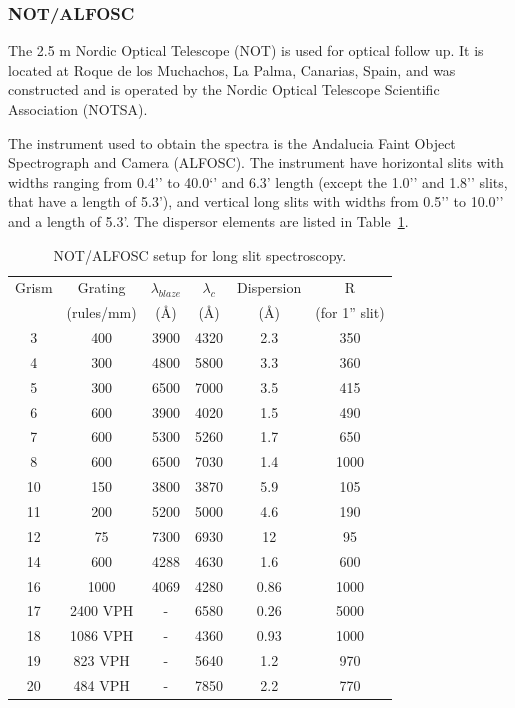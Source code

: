 \subsubsection{NOT/ALFOSC}
\label{sec2:not}

The 2.5 m Nordic Optical Telescope (NOT) is used for optical follow up. It is located at Roque de los Muchachos, La Palma, Canarias, Spain, and was constructed and is operated by the Nordic Optical Telescope Scientific Association (NOTSA). 

The instrument used to obtain the spectra is the Andalucia Faint Object Spectrograph and Camera (ALFOSC). The instrument have horizontal slits with widths ranging from 0.4’’ to 40.0‘’ and 6.3’ length (except the 1.0’’ and 1.8’’ slits, that have a length of 5.3’), and vertical long slits with widths from 0.5’’ to 10.0’’ and a length of 5.3’. The dispersor elements are listed in Table~\ref{tab2:not}.

\begin{table}
\begin{center}
\caption{NOT/ALFOSC setup for long slit spectroscopy.}
\begin{tabular}{|c|c|c|c|c|c|}
\hline
Grism & Grating & $\lambda_{blaze}$ & $\lambda_{c}$ & Dispersion & R \\ 
  & (rules/mm)  & (\AA) & (\AA) & (\AA) & (for 1'' slit) \\ \hline
3 & 400 & 3900 & 4320 & 2.3 & 350  \\ \hline
4 & 300 & 4800 & 5800 & 3.3  &  360 \\ \hline
5 & 300 & 6500 & 7000 & 3.5  & 415  \\ \hline
6 & 600 & 3900 & 4020 & 1.5  & 490  \\ \hline
7 & 600 & 5300 & 5260 & 1.7  & 650  \\ \hline
8 & 600 & 6500 & 7030 & 1.4  &  1000 \\ \hline
10 & 150 & 3800 & 3870 & 5.9  & 105  \\ \hline
11 & 200 & 5200 & 5000 & 4.6  &  190 \\ \hline
12 & 75 & 7300 & 6930 & 12  &   95 \\ \hline
14 & 600 & 4288 & 4630 & 1.6  &  600 \\ \hline
16 & 1000 & 4069 & 4280 & 0.86  &  1000	 \\ \hline
17 & 2400 VPH  & - & 6580 & 0.26  & 5000  \\ \hline
18 & 1086 VPH  & - & 4360 & 0.93  &  1000 \\ \hline
19 & 823 VPH   & - & 5640 & 1.2  & 970  \\ \hline
20 & 484 VPH   & - & 7850 & 2.2  &  770 \\ 
\hline
\end{tabular}
\label{tab2:not}
\end{center}
\end{table}


